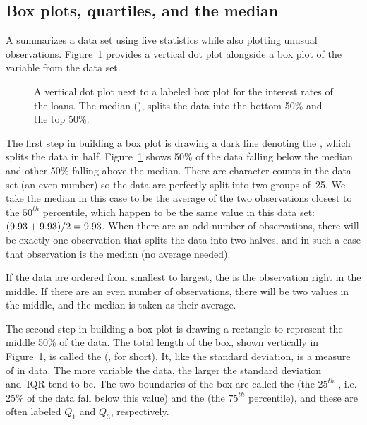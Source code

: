 \subsection{Box plots, quartiles, and the median}

A  summarizes a data set using five
statistics while also plotting unusual observations.
Figure~\ref{loan_int_rate_box_plot_layout} provides
a vertical dot plot alongside a box plot of the
 variable from
the  data set.

\begin{figure}[h]
  \centering
  \caption{A vertical dot plot next to a labeled box plot
      for the interest rates of the \loanN{} loans.
      The median (\loanMedian{}), splits the data into the
      bottom 50\% and the top 50\%.}
  \label{loan_int_rate_box_plot_layout}
\end{figure}

The first step in building a box plot is drawing a dark line
denoting the , which splits the data in half.
Figure~\ref{loan_int_rate_box_plot_layout} shows 50\% of the
data falling below the median and other 50\% falling above
the median.
There are \loanN{} character counts in the data set
(an even number) so the data are perfectly split into two
groups of~25.
We take the median in this case to be the average of the
two observations closest to the $50^{th}$ percentile,
which happen to be the same value in this data set:
$(\text{9.93{}} + \text{9.93{}}) / 2
  = \text{9.93{}}$.
When there are an odd number of observations,
there will be exactly one observation that splits the data
into two halves, and in such a case that observation
is the median (no average needed).

\begin{termBox}{
  If the data are ordered from smallest to largest,
  the  is the observation right in the middle.
  If there are an even number of observations,
  there will be two values in the middle,
  and the median is taken as their average.}
\end{termBox}

The second step in building a box plot is drawing
a rectangle to represent the middle 50\% of the data.
The total length of the box, shown vertically in
Figure~\ref{loan_int_rate_box_plot_layout},
is called the  (,
for short).
It, like the standard deviation, is a measure
of  in data.
The more variable the data, the larger the standard
deviation and~IQR tend to be.
The two boundaries of the box are called the
 
(the $25^{th}$ ,
i.e. 25\% of the data fall below this value)
and the  
(the $75^{th}$ percentile), and these are often labeled $Q_1$
 and $Q_3$, respectively.

